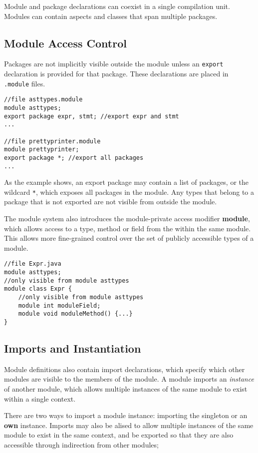 Module and package declarations can coexist in a single compilation unit.
Modules can contain aspects and classes that span multiple packages.

\subsection{Module Access Control}

Packages are not implicitly visible outside the module unless an
\texttt{export} declaration is provided for that package. These declarations
are placed in \texttt{.module} files.

\begin{lstlisting}[caption={Export Package}]
//file asttypes.module
module asttypes;
export package expr, stmt; //export expr and stmt
...

//file prettyprinter.module
module prettyprinter;
export package *; //export all packages
...
\end{lstlisting}

As the example shows, an export package may contain a list of packages, or the
wildcard \texttt{*}, which exposes all packages in the module. Any types that
belong to a package that is not exported are not visible from outside the module.

The module system also introduces the module-private access modifier \textbf{module},
which allows access to a type, method or field from the within the same module. This
allows more fine-grained control over the set of publicly accessible types of a module.

\begin{lstlisting}
//file Expr.java
module asttypes;
//only visible from module asttypes
module class Expr {
	//only visible from module asttypes
	module int moduleField;
	module void moduleMethod() {...}
}
\end{lstlisting}

\subsection{Imports and Instantiation}

Module definitions also contain import declarations, which specify which
other modules are visible to the members of the module. A module imports 
an \textit{instance} of another module, which allows multiple instances
of the same module to exist within a single context.

There are two ways to import a module instance: importing the singleton or
an \textbf{own} instance. Imports may also be alised to allow multiple instances
of the same module to exist in the same context, and be exported so that
they are also accessible through indirection from other modules;

